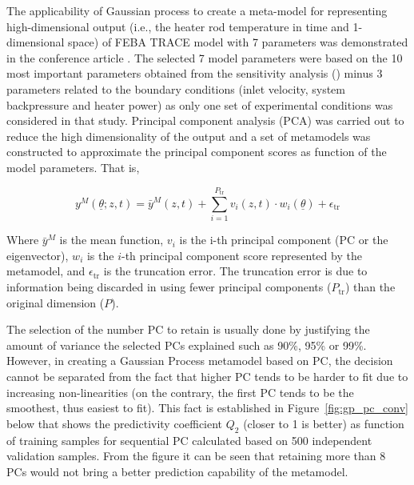 \documentclass[11pt,titlepage]{article}
\begin{document}
The applicability of Gaussian process to create a meta-model for representing 
high-dimensional output (i.e., the heater rod temperature in time and 
1-dimensional space) of FEBA TRACE model with 7 parameters was demonstrated 
in the conference article \cite{Wicaksono2016}. The selected 7 model parameters 
were based on the 10 most important parameters obtained from the sensitivity 
analysis (\cite{Wicaksono2016}) minus 3 parameters related to 
the boundary conditions (inlet velocity, system backpressure and heater power)
as only one set of experimental conditions was considered in that study.
Principal component analysis (PCA) was carried out to reduce the 
high dimensionality of the output and a set of metamodels was constructed to 
approximate the principal component scores as function of the model parameters. 
That is,

\begin{equation}
	y^M(\underline{\theta};z,t) = \bar{y}^M(z,t) + \sum_{i=1}^{P_\text{tr}} v_i(z,t) \cdot w_i(\underline{\theta}) + \epsilon_\text{tr}
\end{equation}

Where $\bar{y}^M$  is the mean function, $v_i$ is the i-th principal component 
(PC or the eigenvector), $w_i$ is the $i$-th principal component score 
represented by the metamodel, and $\epsilon_\text{tr}$ is the truncation 
error. The truncation error is due to information being discarded in using fewer 
principal components ($P_\text{tr}$) than the original dimension ($P$).

The selection of the number PC to retain is usually done by justifying the 
amount of variance the selected PCs explained such as 90\%, 95\% or 99\%. 
However, in creating a Gaussian Process metamodel based on PC, the 
decision cannot be separated from the fact that higher PC tends to be 
harder to fit due to increasing non-linearities (on the contrary, 
the first PC tends to be the smoothest, thus easiest to fit). 
This fact is established in Figure~\ref{fig:gp_pc_conv} below that shows the 
predictivity coefficient $Q_2$ (closer to 1 is better) as function of 
training samples for sequential PC calculated based on 500 independent 
validation samples. From the figure it can be seen that retaining more than 
8 PCs would not bring a better prediction capability of the metamodel.
\end{document}
